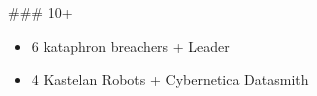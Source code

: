 \documentclass{HordeModeTarot}
\begin{document}
\begin{multicols}{2}
\#\#\# 10+

\begin{itemize}[leftmargin=*]
\item[] 6 kataphron breachers + Leader
\item[] 4 Kastelan Robots + Cybernetica Datasmith
\end{itemize}


\end{multicols}
\end{document}
